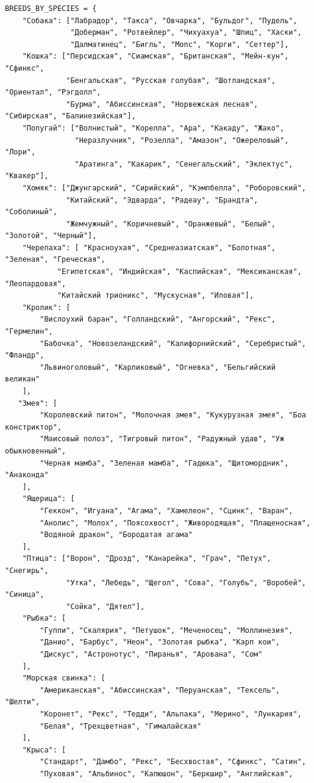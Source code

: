 \documentclass[a4paper]{article}
\begin{document}
\begin{lstlisting}[caption = Генерация значений для таблиц, basicstyle= \scriptsize \ttfamily]
BREEDS_BY_SPECIES = {
    "Собака": ["Лабрадор", "Такса", "Овчарка", "Бульдог", "Пудель", 
               "Доберман", "Ротвейлер", "Чихуахуа", "Шпиц", "Хаски",
               "Далматинец", "Бигль", "Мопс", "Корги", "Сеттер"],
    "Кошка": ["Персидская", "Сиамская", "Британская", "Мейн-кун", "Сфинкс",
              "Бенгальская", "Русская голубая", "Шотландская", "Ориентал", "Рэгдолл",
              "Бурма", "Абиссинская", "Норвежская лесная", "Сибирская", "Балинезийская"],
    "Попугай": ["Волнистый", "Корелла", "Ара", "Какаду", "Жако",
                "Неразлучник", "Розелла", "Амазон", "Ожереловый", "Лори",
                "Аратинга", "Какарик", "Сенегальский", "Эклектус", "Квакер"],
    "Хомяк": ["Джунгарский", "Сирийский", "Кэмпбелла", "Роборовский",
              "Китайский", "Эдварда", "Радеау", "Брандта", "Соболиный",
              "Жемчужный", "Коричневый", "Оранжевый", "Белый", "Золотой", "Черный"],
    "Черепаха": [ "Красноухая", "Среднеазиатская", "Болотная", "Зеленая", "Греческая",
            "Египетская", "Индийская", "Каспийская", "Мексиканская", "Леопардовая",
            "Китайский трионикс", "Мускусная", "Иловая"],
    "Кролик": [
        "Вислоухий баран", "Голландский", "Ангорский", "Рекс", "Гермелин",
        "Бабочка", "Новозеландский", "Калифорнийский", "Серебристый", "Фландр",
        "Львиноголовый", "Карликовый", "Огневка", "Бельгийский великан"
    ],
   "Змея": [
        "Королевский питон", "Молочная змея", "Кукурузная змея", "Боа констриктор",
        "Маисовый полоз", "Тигровый питон", "Радужный удав", "Уж обыкновенный",
        "Черная мамба", "Зеленая мамба", "Гадюка", "Щитомордник", "Анаконда"
    ],
    "Ящерица": [
        "Геккон", "Игуана", "Агама", "Хамелеон", "Сцинк", "Варан",
        "Анолис", "Молох", "Поясохвост", "Живородящая", "Плащеносная",
        "Водяной дракон", "Бородатая агама"
    ],
    "Птица": ["Ворон", "Дрозд", "Канарейка", "Грач", "Петух", "Снегирь",
              "Утка", "Лебедь", "Щегол", "Сова", "Голубь", "Воробей", "Синица",
              "Сойка", "Дятел"],
    "Рыбка": [
        "Гуппи", "Скалярия", "Петушок", "Меченосец", "Моллинезия",
        "Данио", "Барбус", "Неон", "Золотая рыбка", "Карп кои",
        "Дискус", "Астронотус", "Пиранья", "Арована", "Сом"
    ],
    "Морская свинка": [
        "Американская", "Абиссинская", "Перуанская", "Тексель", "Шелти",
        "Коронет", "Рекс", "Тедди", "Альпака", "Мерино", "Лункария",
        "Белая", "Трехцветная", "Гималайская"
    ],
    "Крыса": [
        "Стандарт", "Дамбо", "Рекс", "Бесхвостая", "Сфинкс", "Сатин",
        "Пуховая", "Альбинос", "Капюшон", "Беркшир", "Английская",

\end{lstlisting}
\end{document}
